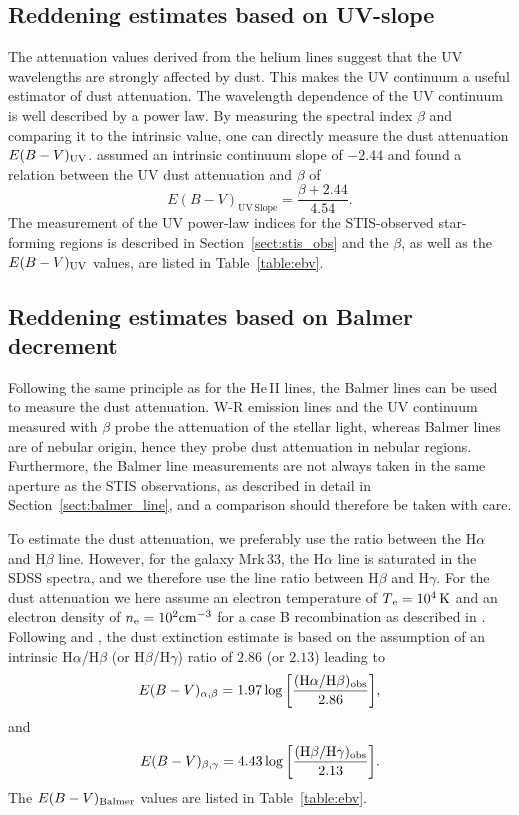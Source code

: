 \documentclass[linenumbers]{aastex63}
\begin{document}
\subsection{Reddening estimates based on UV-slope}\label{sect:red_uv}
The attenuation values derived from the helium lines suggest that the UV wavelengths are strongly affected by dust. This makes the UV continuum a useful estimator of dust attenuation. The wavelength dependence of the UV continuum  is well described by a power law. By measuring the spectral index $\beta$ and comparing it to the intrinsic value, one can directly measure the dust attenuation ${E(B-V)_{\rm UV}}$. \citet{reddy_mosdef_2015} assumed an intrinsic continuum slope of $-2.44$ and found a relation between the UV dust attenuation and $\beta$ of
\begin{equation}\label{eq:6}
    E(B-V)_{\mathrm{UV\, Slope}} = \frac{\beta + 2.44}{4.54}.
\end{equation}
The measurement of the UV power-law indices for the STIS-observed star-forming regions is described in Section~\ref{sect:stis_obs} and the $\beta$, as well as the  ${E(B-V)_{\rm UV}}$ values, are listed in Table~\ref{table:ebv}.

\subsection{Reddening estimates based on Balmer decrement}\label{sect:red_balmer}
Following the same principle as for the He\,II lines, the Balmer lines can be used to measure the dust attenuation. 
W-R emission lines and the UV continuum measured with $\beta$ probe the attenuation of the stellar light, whereas Balmer lines are of nebular origin, hence they probe dust attenuation in nebular regions. Furthermore, the Balmer line measurements are not always taken in the same aperture as the STIS observations, as described in detail in Section~\ref{sect:balmer_line}, and a comparison should therefore be taken with care.

To estimate the dust attenuation, we preferably use the ratio between the H$\alpha$ and H$\beta$ line. However, for the galaxy Mrk\,33, the H$\alpha$ line is saturated in the SDSS spectra, and we therefore use the line ratio between H$\beta$ and H$\gamma$. 
For the dust attenuation we here assume an electron temperature of $T{\rm _e=10^4\,K}$ and an electron density of $n_{\rm e} = 10^2 {\rm cm^{-3}}$ for a case B recombination as described in \citet{osterbrock_astrophysics_1989}. 
Following \citet{momcheva_nebular_2013} and \citet{dominguez_dust_2013}, the dust extinction estimate is based on the assumption of an intrinsic H$\alpha$/H$\beta$ (or  H$\beta$/H$\gamma$) ratio of $2.86$ (or $2.13$) leading to 
\begin{equation}\label{eq:ebv_alpha_beta}
    E(B-V)_{\alpha,\beta} = {\rm 1.97\, log \left[ \frac{(H\alpha / H\beta)_{obs}}{2.86}\right]},
\end{equation}
and
\begin{equation}\label{eq:ebv_beta_gama}
    E(B-V)_{\beta,\gamma} = {\rm 4.43\, log \left[ \frac{(H\beta / H\gamma)_{obs}}{2.13}\right]}.
\end{equation}
The ${E(B-V)_{\rm Balmer}}$ values are listed in Table~\ref{table:ebv}.
%

%
\end{document}
